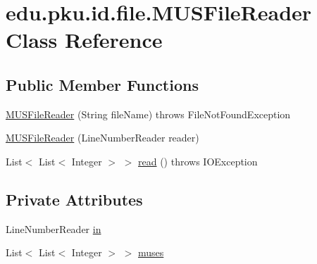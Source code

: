 \hypertarget{classedu_1_1pku_1_1id_1_1file_1_1_m_u_s_file_reader}{
\section{edu.pku.id.file.MUSFileReader Class Reference}
\label{classedu_1_1pku_1_1id_1_1file_1_1_m_u_s_file_reader}
}
\subsection*{Public Member Functions}
\begin{DoxyCompactItemize}
\item 
\hyperlink{classedu_1_1pku_1_1id_1_1file_1_1_m_u_s_file_reader_aa37746001f3fb55704ea6f275dbfa9b2}{MUSFileReader} (String fileName)  throws FileNotFoundException 
\item 
\hyperlink{classedu_1_1pku_1_1id_1_1file_1_1_m_u_s_file_reader_a753bff7f7238d13211abfa17c531741a}{MUSFileReader} (LineNumberReader reader)
\item 
List$<$ List$<$ Integer $>$ $>$ \hyperlink{classedu_1_1pku_1_1id_1_1file_1_1_m_u_s_file_reader_a8367a47506baf8841ffb88aa4180d31d}{read} ()  throws IOException 
\end{DoxyCompactItemize}
\subsection*{Private Attributes}
\begin{DoxyCompactItemize}
\item 
LineNumberReader \hyperlink{classedu_1_1pku_1_1id_1_1file_1_1_m_u_s_file_reader_af176cb943376789226dd691f24f6c2e6}{in}
\item 
List$<$ List$<$ Integer $>$ $>$ \hyperlink{classedu_1_1pku_1_1id_1_1file_1_1_m_u_s_file_reader_ae7598813fc97a674c9dfdc50f79f1d52}{muses}
\end{DoxyCompactItemize}


